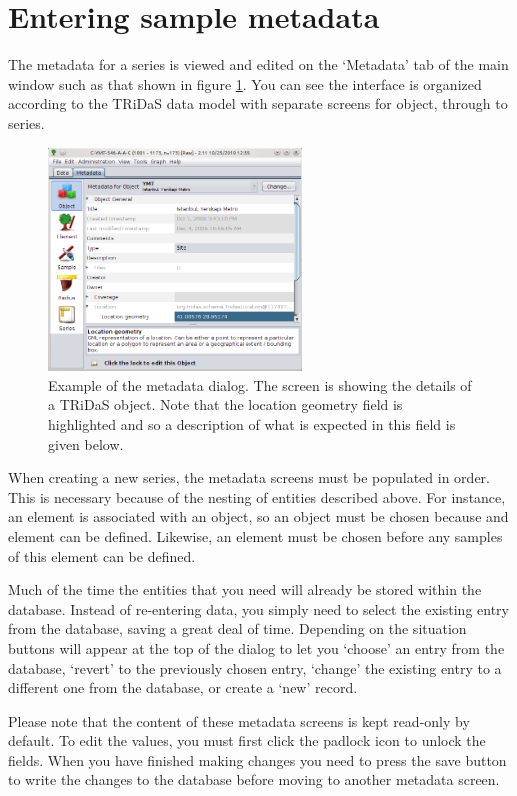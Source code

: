 \section{Entering sample metadata}

The metadata for a series is viewed and edited on the `Metadata' tab of the main window such as that shown in figure \ref{fig:metadata}.  You can see the interface is organized according to the TRiDaS data model with separate screens for object, through to series.  

\begin{figure}
\centering
\includegraphics[width=0.6\textwidth]{Images/metadata.png}
\caption{Example of the metadata dialog.  The screen is showing the details of a TRiDaS object.  Note that the location geometry field is highlighted and so a description of what is expected in this field is given below.} 
\label{fig:metadata}
\end{figure}

When creating a new series, the metadata screens must be populated in order.  This is necessary because of the nesting of entities described above.  For instance, an element is associated with an object, so an object must be chosen because and element can be defined.  Likewise, an element must be chosen before any samples of this element can be defined.  

Much of the time the entities that you need will already be stored within the database.  Instead of re-entering data, you simply need to select the existing entry from the database, saving a great deal of time.  Depending on the situation buttons will appear at the top of the dialog to let you `choose' an entry from the database, `revert' to the previously chosen entry, `change' the existing entry to a different one from the database, or create a `new' record.

Please note that the content of these metadata screens is kept read-only by default.  To edit the values, you must first click the padlock icon to unlock the fields.  When you have finished making changes you need to press the save button to write the changes to the database before moving to another metadata screen.

